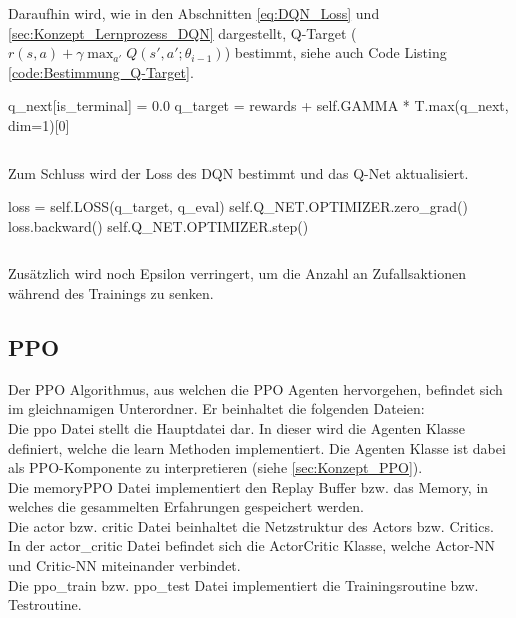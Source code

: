 Daraufhin wird, wie in den Abschnitten \ref{eq:DQN_Loss} und \ref{sec:Konzept_Lernprozess_DQN} dargestellt, Q-Target ($r(s,a) +\gamma \max_{a'}Q(s',a';\theta_{i-1})$) bestimmt, siehe auch Code Listing \ref{code:Bestimmung_Q-Target}.
\begin{python}
q_next[is_terminal] = 0.0
q_target = rewards + self.GAMMA * T.max(q_next, dim=1)[0]
\end{python}
\begin{lstlisting}[caption=Bestimmung von Q-Target, label=code:Bestimmung_Q-Target]
\end{lstlisting}
Zum Schluss wird der Loss des DQN bestimmt und das Q-Net aktualisiert.
\begin{python}
loss = self.LOSS(q_target, q_eval)
self.Q_NET.OPTIMIZER.zero_grad()
loss.backward()
self.Q_NET.OPTIMIZER.step()
\end{python}
\begin{lstlisting}[caption=Bestimmung des DQN Loss \& Update des Q-Networks, label=code:Bestimmung_DQN-Loss]
\end{lstlisting}
Zusätzlich wird noch Epsilon verringert, um die Anzahl an Zufallsaktionen während des Trainings zu senken.

\subsection{PPO}
Der PPO Algorithmus, aus welchen die PPO Agenten hervorgehen, befindet sich im gleichnamigen Unterordner. Er beinhaltet die folgenden Dateien:\\
Die ppo Datei stellt die Hauptdatei dar. In dieser wird die Agenten Klasse definiert, welche die learn Methoden implementiert. Die Agenten Klasse ist dabei als PPO-Komponente zu interpretieren (siehe \ref{sec:Konzept_PPO}).\\
Die memoryPPO Datei implementiert den Replay Buffer bzw. das Memory, in welches die gesammelten Erfahrungen gespeichert werden.\\
Die actor bzw. critic Datei beinhaltet die Netzstruktur des Actors bzw. Critics.\\
In der actor\_critic Datei befindet sich die ActorCritic Klasse, welche Actor-NN und Critic-NN miteinander verbindet.\\
Die ppo\_train bzw. ppo\_test Datei implementiert die Trainingsroutine bzw. Testroutine.

